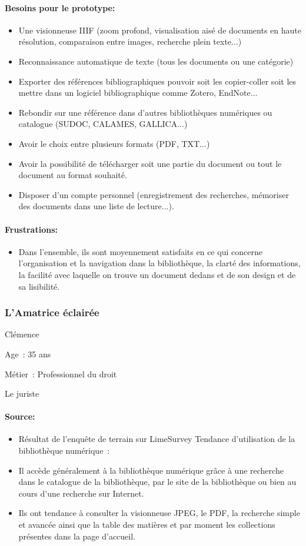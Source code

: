 \paragraph*{Besoins pour le prototype:}
\begin{itemize}
	\item Une visionneuse IIIF (zoom profond, visualisation aisé de documents en haute résolution, comparaison entre images, recherche plein texte...)
\item Reconnaissance automatique de texte (tous les documents ou une catégorie)
\item Exporter des références bibliographiques pouvoir soit les copier-coller soit les mettre dans un logiciel bibliographique comme Zotero, EndNote...
\item Rebondir sur une référence dans d'autres bibliothèques numériques ou catalogue (SUDOC, CALAMES, GALLICA...)
\item Avoir le choix entre plusieurs formats (PDF, TXT...)
\item Avoir la possibilité de télécharger soit une partie du document ou tout le document au format souhaité.
\item Disposer d'un compte personnel (enregistrement des recherches, mémoriser des documents dans une liste de lecture...).
\end{itemize}
\paragraph*{Frustrations:}
\begin{itemize}
	\item Dans l’ensemble, ils sont moyennement satisfaits en ce qui concerne l’organisation et la navigation dans la bibliothèque, la clarté des informations, la facilité avec laquelle on trouve un document dedans et de son design et de sa lisibilité.
\end{itemize}

\subsubsection*{L’Amatrice éclairée}
Clémence 

Age : 35 ans

Métier : Professionnel du droit

Le juriste

\paragraph*{Source:}
\begin{itemize}
	\item Résultat de l’enquête de terrain sur LimeSurvey
Tendance d’utilisation de la bibliothèque numérique :
\item Il accède généralement à la bibliothèque numérique grâce à une recherche dans le catalogue de la bibliothèque, par le site de la bibliothèque ou bien au cours d’une recherche sur Internet.
\item Ils ont tendance à consulter la visionneuse JPEG, le PDF, la recherche simple et avancée ainsi que la table des matières et par moment les collections présentes dans la page d’accueil.
\end{itemize}
